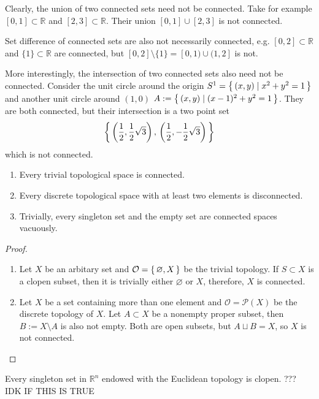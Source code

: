 %
\begin{example}
    Clearly, the union of two connected sets need not be connected. Take for example \([0, 1] \subset \mathbb{R}\) and \([2, 3] \subset \mathbb{R}\). Their union \([0, 1] \cup [2, 3]\) is not connected.

    Set difference of connected sets are also not necessarily connected, e.g. \([0, 2] \subset \mathbb{R}\) and \(\{1\} \subset \mathbb{R}\) are connected, but \([0, 2] \setminus \{1\} = [0, 1) \cup (1, 2]\) is not.

    More interestingly, the intersection of two connected sets also need not be connected. Consider the unit circle around the origin \(S^1 = \left\{\, (x, y) \mid x^2 + y^2 = 1 \,\right\}\) and another unit circle around \((1, 0)\) \(A := \left\{\, (x, y) \mid (x-1)^2 + y^2 = 1 \,\right\}\). They are both connected, but their intersection is a two point set
    \begin{equation*}
        \left\{\, \left(\frac{1}{2}, \frac{1}{2}\sqrt{3}\right),\, \left(\frac{1}{2}, -\frac{1}{2}\sqrt{3}\right) \,\right\}
    \end{equation*}
    which is not connected.
\end{example}
%
%
\begin{thmbox}
    \begin{proposition}
        \begin{enumerate}
            \item Every trivial topological space is connected.
            \item Every discrete topological space with at least two elements is disconnected.
            \item Trivially, every singleton set and the empty set are connected spaces vacuously.
        \end{enumerate}
    \end{proposition}
\end{thmbox}
%
\begin{proof}
    \begin{enumerate}
        \item Let \(X\) be an arbitary set and \(\mathcal{O} = \left\{\, \varnothing, X \,\right\}\) be the trivial topology. If \(S \subset X\) is a clopen subset, then it is trivially either \(\varnothing\) or \(X\), therefore, \(X\) is connected.
        \item Let \(X\) be a set containing more than one element and \(\mathcal{O} = \mathcal{P}(X)\) be the discrete topology of \(X\). Let \(A \subset X\) be a nonempty proper subset, then \(B := X \setminus A\) is also not empty. Both are open subsets, but \(A \sqcup B = X\), so \(X\) is not connected.
    \end{enumerate}
\end{proof}
%
\begin{thmbox}
    \begin{proposition}
        Every singleton set in \(\mathbb{R}^n\) endowed with the Euclidean topology is clopen. ??? IDK IF THIS IS TRUE
    \end{proposition}
\end{thmbox}
%
